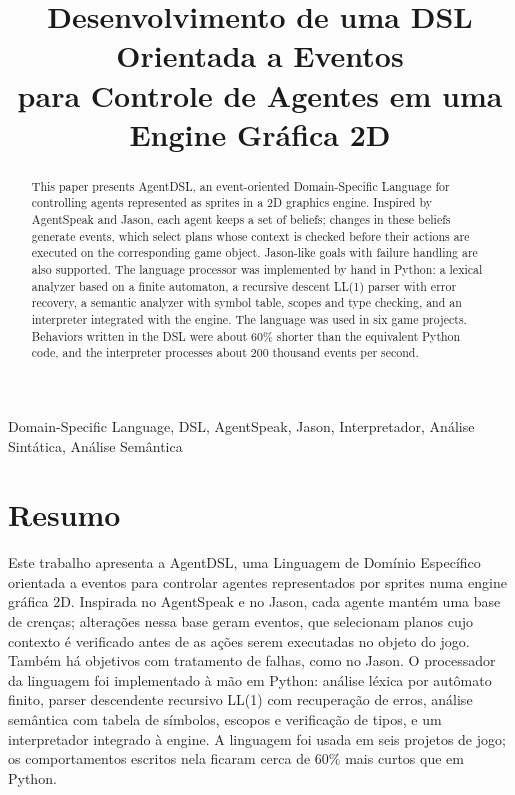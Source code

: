 \documentclass[conference]{IEEEtran}
\begin{document}
\title{Desenvolvimento de uma DSL Orientada a Eventos \\ para Controle de Agentes em uma Engine Gráfica 2D}
\author{
}
\maketitle
\begin{abstract}
This paper presents AgentDSL, an event-oriented Domain-Specific Language for controlling agents represented as sprites in a 2D graphics engine. Inspired by AgentSpeak and Jason, each agent keeps a set of beliefs; changes in these beliefs generate events, which select plans whose context is checked before their actions are executed on the corresponding game object. Jason-like goals with failure handling are also supported. The language processor was implemented by hand in Python: a lexical analyzer based on a finite automaton, a recursive descent LL(1) parser with error recovery, a semantic analyzer with symbol table, scopes and type checking, and an interpreter integrated with the engine. The language was used in six game projects. Behaviors written in the DSL were about 60\% shorter than the equivalent Python code, and the interpreter processes about 200 thousand events per second.
\end{abstract}
\begin{IEEEkeywords}
Domain-Specific Language, DSL, AgentSpeak, Jason, Interpretador, Análise Sintática, Análise Semântica
\end{IEEEkeywords}
\section*{Resumo}
Este trabalho apresenta a AgentDSL, uma Linguagem de Domínio Específico orientada a eventos para controlar agentes representados por sprites numa engine gráfica 2D. Inspirada no AgentSpeak e no Jason, cada agente mantém uma base de crenças; alterações nessa base geram eventos, que selecionam planos cujo contexto é verificado antes de as ações serem executadas no objeto do jogo. Também há objetivos com tratamento de falhas, como no Jason. O processador da linguagem foi implementado à mão em Python: análise léxica por autômato finito, parser descendente recursivo LL(1) com recuperação de erros, análise semântica com tabela de símbolos, escopos e verificação de tipos, e um interpretador integrado à engine. A linguagem foi usada em seis projetos de jogo; os comportamentos escritos nela ficaram cerca de 60\% mais curtos que em Python.
\end{document}
